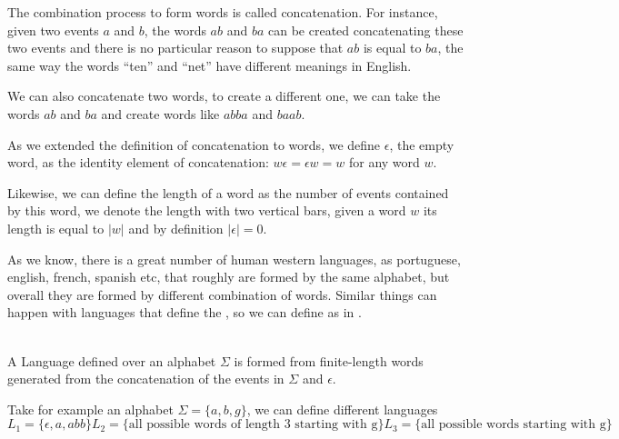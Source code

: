 The combination process to form words is called concatenation. For instance,
given two events $a$ and $b$, the words $ab$ and $ba$ can be created concatenating these two events and there is no particular reason to suppose that $ab$ is equal to $ba$, the same way the words ``ten'' and ``net'' have different meanings in English.

We can also concatenate two words, to create a different one, we can take the
words $ab$ and $ba$ and create words like $abba$ and $baab$.

As we extended the definition of concatenation to words, we define $\epsilon$,
the empty word, as the identity element of concatenation: $w\epsilon = \epsilon
w = w$ for any word $w$.

Likewise, we can define the length of a word as the number of events contained
by this word, we denote the length with two vertical bars, given a word $w$ its
length is equal to $|w|$ and by definition $|\epsilon| = 0 $.

As we know, there is a great number of human western languages, as portuguese,
english, french, spanish etc, that roughly are formed by the same alphabet, but
overall they are formed by different combination of words. Similar things can
happen with languages that define the \DESs, so we can define as in
\cite{cassandras2009introduction}. \pagebreak
\begin{definition}[Language]
  \label{def:language}~\\
  A Language defined over an alphabet $\Sigma$ is formed from finite-length
  words generated from the concatenation of the events in $\Sigma$ and
  $\epsilon$.
\end{definition}

Take for example an alphabet $\Sigma = \{a,b,g\}$, we can define different
languages
\begin{subequations}
  \begin{equation*}
  L_1=\{\epsilon, a, abb\}
  \end{equation*}
  \begin{equation*}
  L_2=\{\text{all possible words of length 3 starting with g}\}
  \end{equation*}
  \begin{equation*}
  L_3=\{\text{all possible words starting with g}\}
  \end{equation*}
\end{subequations}

